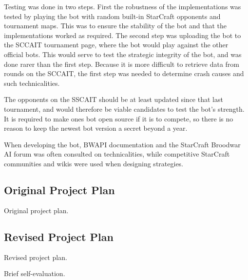 Testing was done in two steps. First the robustness of the implementations was tested by playing the bot with random built-in StarCraft opponents and tournament maps. This was to ensure the stability of the bot and that the implementations worked as required. The second step was uploading the bot to the SCCAIT tournament page, where the bot would play against the other official bots. This would serve to test the strategic integrity of the bot, and was done rarer than the first step. Because it is more difficult to retrieve data from rounds on the SCCAIT, the first step was needed to determine crash causes and such technicalities.

The opponents on the SSCAIT should be at least updated since that last tournament, and would therefore be viable candidates to test the bot's strength. It is required to make ones bot open source if it is to compete, so there is no reason to keep the newest bot version a secret beyond a year.

When developing the bot, BWAPI documentation and the StarCraft Broodwar AI forum was often consulted on technicalities, while competitive StarCraft communities and wikis were used when designing strategies.

	\subsection*{Original Project Plan}
	Original project plan.
	
	\subsection*{Revised Project Plan}
	Revised project plan.

Brief self-evaluation.

